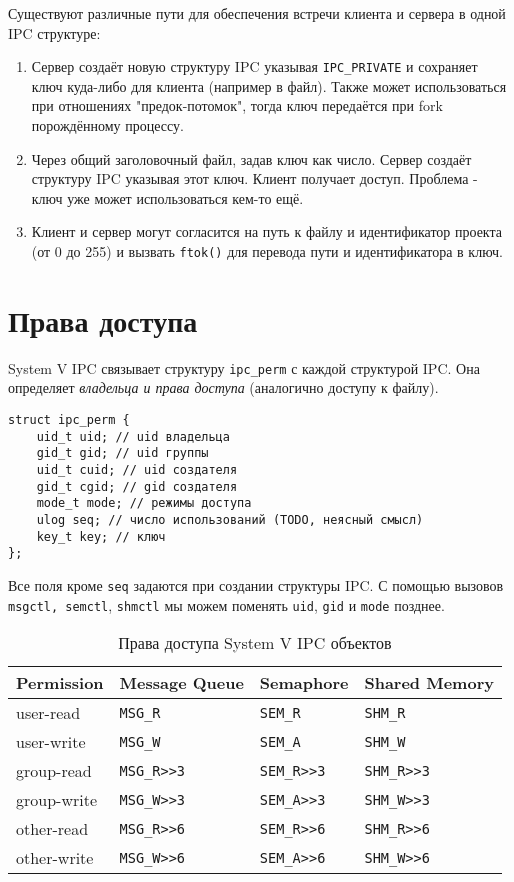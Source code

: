Существуют различные пути для обеспечения встречи клиента и сервера в одной IPC структуре:
\begin{enumerate}
\item Сервер создаёт новую структуру IPC указывая \verb+IPC_PRIVATE+ и сохраняет ключ куда-либо для клиента (например в файл).  Также может использоваться при отношениях "предок-потомок", тогда ключ передаётся при fork порождённому процессу.
\item Через общий заголовочный файл, задав ключ как число. Сервер создаёт структуру IPC указывая этот ключ. Клиент получает доступ. Проблема - ключ уже может использоваться кем-то ещё.
\item Клиент и сервер могут согласится на путь к файлу и идентификатор проекта (от 0 до 255) и вызвать \verb+ftok()+ для перевода пути и идентификатора в ключ.
\end{enumerate}

\section{Права доступа}

System V IPC связывает структуру \verb+ipc_perm+ с каждой структурой IPC. Она определяет 
\emph{владельца и права доступа} (аналогично доступу к файлу).

\begin{verbatim}
struct ipc_perm {
	uid_t uid; // uid владельца
	gid_t gid; // uid группы
	uid_t cuid; // uid создателя 
	gid_t cgid; // gid создателя
	mode_t mode; // режимы доступа
	ulog seq; // число использований (TODO, неясный смысл)
	key_t key; // ключ
};
\end{verbatim}

Все поля кроме \verb+seq+ задаются при создании структуры IPC. С помощью вызовов \verb+msgctl, +\verb+semctl+, \verb+shmctl+ мы можем поменять \verb+uid+, \verb+gid+ и \verb+mode+ позднее.

\begin{table}[hbtp]
\caption{Права доступа System V IPC объектов}
\begin{tabular}{ l l l l  }
	Permission & Message Queue & Semaphore & Shared Memory \\
	\hline
	user-read  & \verb+MSG_R+ & \verb+SEM_R+ & \verb+SHM_R+ \\
	user-write & \verb+MSG_W+ & \verb+SEM_A+ & \verb+SHM_W+ \\
	\hline
	group-read  & \verb+MSG_R>>3+ & \verb+SEM_R>>3+ & \verb+SHM_R>>3+ \\
	group-write & \verb+MSG_W>>3+ & \verb+SEM_A>>3+ & \verb+SHM_W>>3+ \\
	\hline
	other-read  & \verb+MSG_R>>6+ & \verb+SEM_R>>6+ & \verb+SHM_R>>6+ \\
	other-write & \verb+MSG_W>>6+ & \verb+SEM_A>>6+ & \verb+SHM_W>>6+ \\
	\hline
\end{tabular}
\label{sysvipc_perm}
\end{table}

